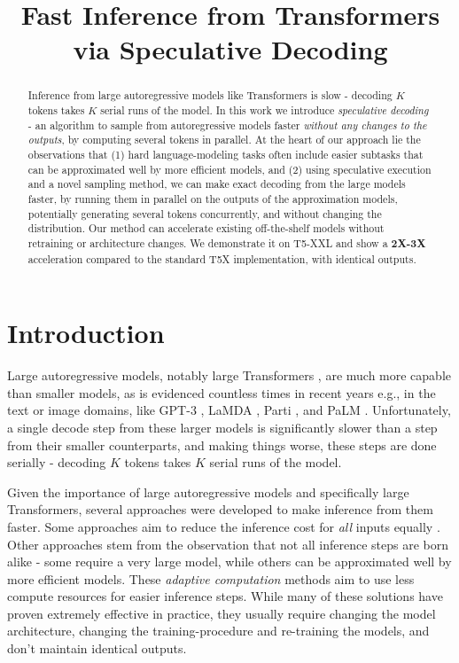 \title{Fast Inference from Transformers via Speculative Decoding}

\begin{abstract}
Inference from large autoregressive models like Transformers is slow - decoding $K$ tokens takes $K$ serial runs of the model. In this work we introduce \emph{speculative decoding} - an algorithm to sample from autoregressive models faster \emph{without any changes to the outputs}, by computing several tokens in parallel. At the heart of our approach lie the observations that (1) hard language-modeling tasks often include easier subtasks that can be approximated well by more efficient models, and (2) using speculative execution and a novel sampling method, we can make exact decoding from the large models faster, by running them in parallel on the outputs of the approximation models, potentially generating several tokens concurrently, and without changing the distribution. Our method can accelerate existing off-the-shelf models without retraining or architecture changes. We demonstrate it on T5-XXL and show a \textbf{2X-3X} acceleration compared to the standard T5X implementation, with identical outputs.
\end{abstract}

\section{Introduction}
\label{sec:introduction}

Large autoregressive models, notably large Transformers \citep{transformer}, are much more capable than smaller models, as is evidenced countless times in recent years e.g., in the text or image domains, like GPT-3 \citep{gpt3}, LaMDA \citep{lamda}, Parti \citep{parti}, and PaLM \citep{palm}. Unfortunately, a single decode step from these larger models is significantly slower than a step from their smaller counterparts, and making things worse, these steps are done serially - decoding $K$ tokens takes $K$ serial runs of the model.

Given the importance of large autoregressive models and specifically large Transformers, several approaches were developed to make inference from them faster. Some approaches aim to reduce the inference cost for \emph{all} inputs equally
\citep[e.g.][]{Distilling_the_Knowledge_in_a_Neural_Network, Sparse_is_Enough_in_Scaling_Transformers, Quantized_Neural_Networks, Primer, multi-query-attn}. Other approaches stem from the observation that not all inference steps are born alike - some require a very large model, while others can be approximated well by more efficient models. These \emph{adaptive computation} methods
\citep[e.g.][]{Dynamic_Neural_Networks_Survey, Adaptive_Attention_Span_in_Transformers, Confident_Adaptive_Transformers, early_exits, Controlling_Computation_versus_Quality_Sequence_Models, depth_adaptive_transformer, Matching_Model_and_Instance_Complexities} aim to use less compute resources for easier inference steps. While many of these solutions have proven extremely effective in practice, they usually require changing the model architecture, changing the training-procedure and re-training the models, and don't maintain identical outputs.

